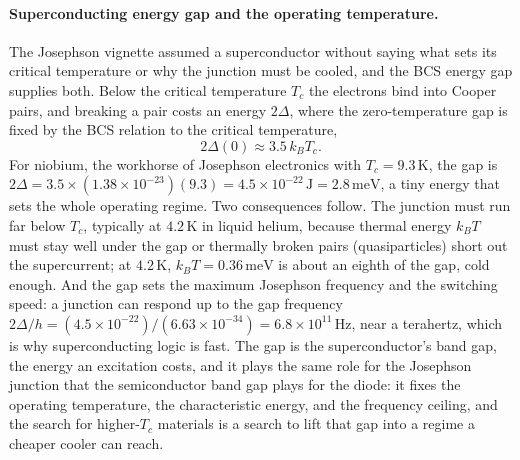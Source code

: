 \paragraph{Superconducting energy gap and the operating temperature.}
The Josephson vignette assumed a superconductor without saying what sets its
critical temperature or why the junction must be cooled, and the BCS energy gap
supplies both. Below the critical temperature $T_c$ the electrons bind into
Cooper pairs, and breaking a pair costs an energy $2\Delta$, where the
zero-temperature gap is fixed by the BCS relation to the critical temperature,
\[
2\Delta(0) \approx 3.5\,k_B T_c.
\]
For niobium, the workhorse of Josephson electronics with $T_c = 9.3\,\si{\kelvin}$,
the gap is $2\Delta = 3.5\times(1.38\times 10^{-23})(9.3) = 4.5\times 10^{-22}\,\si{
\joule} = 2.8\,\si{\milli\electronvolt}$, a tiny energy that sets the whole
operating regime. Two consequences follow. The junction must run far below $T_c$,
typically at $4.2\,\si{\kelvin}$ in liquid helium, because thermal energy $k_B T$
must stay well under the gap or thermally broken pairs (quasiparticles) short out
the supercurrent; at $4.2\,\si{\kelvin}$, $k_B T = 0.36\,\si{\milli\electronvolt}$
is about an eighth of the gap, cold enough. And the gap sets the maximum Josephson
frequency and the switching speed: a junction can respond up to the gap frequency
$2\Delta/h = (4.5\times 10^{-22})/(6.63\times 10^{-34}) = 6.8\times 10^{11}\,\si{
\hertz}$, near a terahertz, which is why superconducting logic is fast. The gap is
the superconductor's band gap, the energy an excitation costs, and it plays the
same role for the Josephson junction that the semiconductor band gap plays for
the diode: it fixes the operating temperature, the characteristic energy, and the
frequency ceiling, and the search for higher-$T_c$ materials is a search to lift
that gap into a regime a cheaper cooler can reach.

